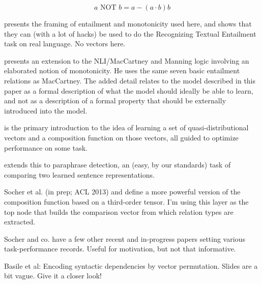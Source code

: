 \documentclass[12pt,leqno,tbtags,twoside]{article}
\theoremstyle{dotless}
\begin{document}
\begin{equation}
a \text{~NOT~} b = a - (a \cdot b)b
\end{equation}

\citet{maccartney2009extended} \citep[from Bill's dissertation][]{maccartney2009natural} presents the framing of entailment and monotonicity used here, and shows that they can (with a lot of hacks) be used to do the Recognizing Textual Entailment task on real language. No vectors here.

\citet{icard2012inclusion} presents an extension to the NLI/MacCartney and Manning logic involving an elaborated notion of monotonicity. He uses the same seven basic entailment relations as MacCartney. The added detail relates to the model described in this paper as a formal description of what the model should ideally be able to learn, and not as a description of a formal property that should be externally introduced into the model.

\citet{socher2011semi} is the primary introduction to the idea of learning a set of quasi-distributional vectors and a composition function on those vectors, all guided to optimize performance on some task.

\citet{socher2011dynamic} extends this to paraphrase detection, an (easy, by our standards) task of comparing two learned sentence representations.

Socher et al. (in prep; ACL 2013) and \citet{chen2013learning} define a more powerful version of the composition function based on a third-order tensor. I'm using this layer as the top node that builds the comparison vector from which relation types are extracted.

Socher and co. have a few other recent and in-progress papers setting various task-performance records. Useful for motivation, but not that informative.



Basile et al: Encoding syntactic dependencies by vector permutation. Slides are a bit vague. Give it a closer look!



{}

\end{document}

